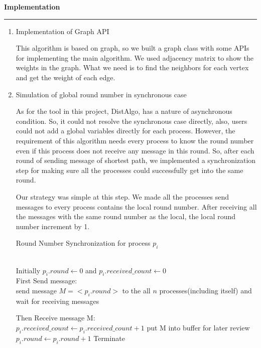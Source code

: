 \documentclass[11pt]{article}  %
\begin{document}

\newpage
\noindent
{\bf Implementation}

\rule{6in}{.1pt}       %

\begin{enumerate}
    \item Implementation of Graph API

    This algorithm is based on graph, so we built a graph class with some APIs for implementing the main algorithm.
    We used adjacency matrix to show the weights in the graph. What we need is to find the neighbors for each vertex and get the weight of each edge.

    \item Simulation of global round number in synchronous case

    As for the tool in this project, DistAlgo, has a nature of asynchronous condition. So, it could not resolve the synchronous case directly, also, users could not add a global variables directly for each process. However, the requirement of this algorithm needs every process to know the round number even if this process does not receive any message in this round. So, after each round of sending message of shortest path, we implemented a synchronization step for making sure all the processes could successfully get into the same round.

    Our strategy was simple at this step. We made all the processes send messages to every process contains the local round number. After receiving all the messages with the same round number as the local, the local round number increment by 1.
    

    \begin{algorithm}[htb]
    \caption{Round Number Synchronization for process $p_i$}
    \label{alg:Framwork}
    \begin{algorithmic}[1] %
    \REQUIRE ~~\\ %
    Initially $p_i.round \gets 0$ and $p_i.received\_count \gets 0$ \\
    First Send message:\\
    \STATE send message $M = <p_i.round>$ to the all $n$ processes(including itself) and wait for receiving messages

    Then Receive message M:\\
    \STATE $p_i.received\_count \gets p_i.received\_count + 1$
    \ELSE
    \STATE put M into buffer for later review
    \ENDIF
    \STATE $p_i.round \gets p_i.round + 1$
    \STATE Terminate
    \ENDIF
    \end{algorithmic}
    \end{algorithm}


\end{enumerate}
\end{document}
